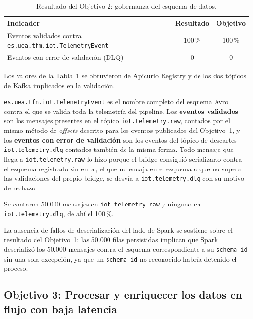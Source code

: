 \begin{table}[H]
  \centering
  \begin{tabular}{|p{6cm}|c|c|}
    \hline
    \textbf{Indicador} & \textbf{Resultado} & \textbf{Objetivo} \\ \hline
    Eventos validados contra \texttt{es.uea.tfm.iot.TelemetryEvent} & 100\,\% & 100\,\% \\ \hline
    Eventos con error de validación (DLQ) & 0 & 0 \\ \hline
  \end{tabular}
  \caption{Resultado del Objetivo 2: gobernanza del esquema de datos.}
  \label{tab:resultado-obj2}
\end{table}

Los valores de la Tabla~\ref{tab:resultado-obj2} se obtuvieron de Apicurio Registry y de los dos tópicos de Kafka implicados en la validación. 

\texttt{es.uea.tfm.iot.TelemetryEvent} es el nombre completo del esquema Avro contra el que se valida toda la telemetría del pipeline. Los \textbf{eventos validados} son los mensajes presentes en el tópico \texttt{iot.telemetry.raw}, contados por el mismo método de \textit{offsets} descrito para los eventos publicados del Objetivo~1, y los \textbf{eventos con error de validación} son los eventos del tópico de descartes \texttt{iot.telemetry.dlq} contados también de la misma forma. Todo mensaje que llega a \texttt{iot.telemetry.raw} lo hizo porque el bridge consiguió serializarlo contra el esquema registrado sin error; el que no encaja en el esquema o que no supera las validaciones del propio bridge, se desvía a \texttt{iot.telemetry.dlq} con su motivo de rechazo.

Se contaron 50.000 mensajes en \texttt{iot.telemetry.raw} y ninguno en \texttt{iot.telemetry.dlq}, de ahí el 100\,\%. 

La ausencia de fallos de deserialización del lado de Spark se sostiene sobre el resultado del Objetivo~1: las 50.000 filas persistidas implican que Spark deserializó los 50.000 mensajes contra el esquema correspondiente a su \texttt{schema\_id} sin una sola excepción, ya que un \texttt{schema\_id} no reconocido habría detenido el proceso.

\subsection{Objetivo 3: Procesar y enriquecer los datos en flujo con baja latencia}

